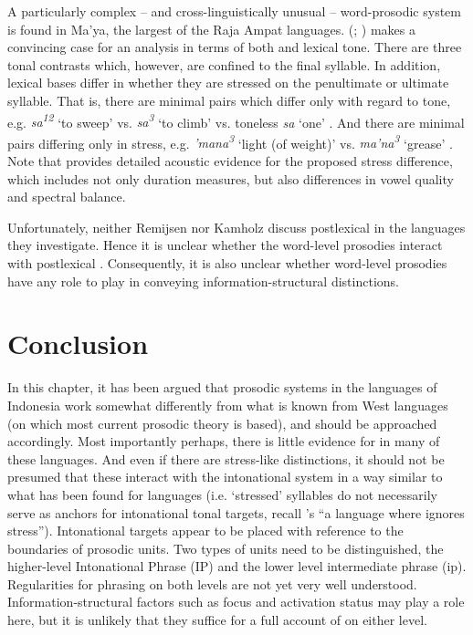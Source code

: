 \documentclass[output=paper
,modfonts
,nonflat]{langsci/langscibook}
\begin{document}
A particularly complex – and cross-linguistically unusual – word-prosodic system is found in Ma'ya, the largest of the Raja Ampat languages. (\citealt{Remijsen2001}; \citealt{Remijsen2002}) makes a convincing case for an analysis in terms of both  and lexical tone. There are three tonal contrasts which, however, are confined to the final syllable. In addition, lexical bases differ in whether they are stressed on the penultimate or ultimate syllable. That is, there are minimal pairs which differ only with regard to tone, e.g. \textit{sa\textsuperscript{12}} ‘to sweep’ vs. \textit{sa\textsuperscript{3} }‘to climb’ vs. toneless \textit{sa} ‘one’ \citep[596]{Remijsen2002}. And there are minimal pairs differing only in stress, e.g. \textit{'mana\textsuperscript{3}} ‘light (of weight)’ vs. \textit{ma'na\textsuperscript{3}} ‘grease’ \citep[600]{Remijsen2002}. Note that \citet[602--610]{Remijsen2002} provides detailed acoustic evidence for the proposed stress difference, which includes not only duration measures, but also differences in vowel quality and spectral balance.

Unfortunately, neither Remijsen nor Kamholz discuss postlexical  in the languages they investigate. Hence it is unclear whether the word-level prosodies interact with postlexical . Consequently, it is also unclear whether word-level prosodies have any role to play in conveying information-structural distinctions.

\section{\label{s:himmelmann:6}Conclusion}

In this chapter, it has been argued that prosodic systems in the  languages of Indonesia work somewhat differently from what is known from West  languages (on which most current prosodic theory is based), and should be approached accordingly. Most importantly perhaps, there is little evidence for  in many of these languages. And even if there are stress-like distinctions, it should not be presumed that these interact with the intonational system in a way similar to what has been found for  languages (i.e. ‘stressed’ syllables do not necessarily serve as anchors for intonational tonal targets, recall \citeauthor{Lindström2005}'s \citeyear{Lindström2005} “a language where  ignores stress”). Intonational targets appear to be placed with reference to the boundaries of prosodic units. Two types of units need to be distinguished, the higher-level Intonational Phrase (IP) and the lower level intermediate phrase (ip). Regularities for phrasing on both levels are not yet very well understood. Information-structural factors such as focus and activation status may play a role here, but it is unlikely that they suffice for a full account of  on either level. 
\end{document}
